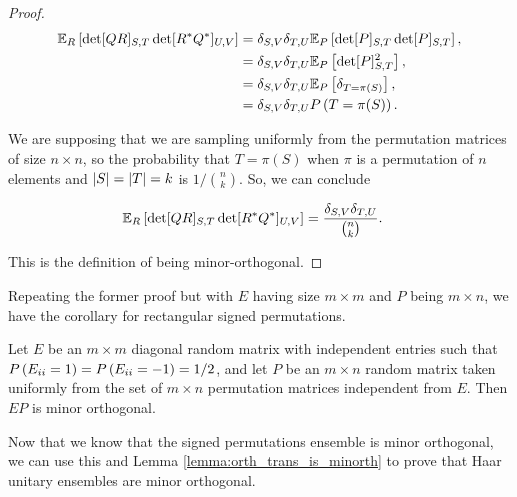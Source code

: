 \begin{proof}
    \begin{align*}
        \mathbb E_R \left[ \det[QR]_{S,T}\det[\hermit{R}\hermit{Q}]_{U,V} \right] &= \delta_{S,V} \delta_{T,U} \mathbb E_{P}\left[ \det [P]_{S,T}\det[P]_{S,T} \right],\\ 
        &= \delta_{S,V} \delta_{T,U} \mathbb E_{P}\left[ \det [P]_{S,T}^2 \right],\\ 
        &= \delta_{S,V} \delta_{T,U} \mathbb E_{P}\left[  \delta_{T=\pi(S)} \right], \\ 
        &= \delta_{S,V} \delta_{T,U} \P{T = \pi(S)}.
    \end{align*}

    We are supposing that we are sampling uniformly from the permutation matrices of size $n \times n$, so the probability that $T = \pi(S)$ when $\pi$ is a permutation of $n$ elements and $\abs{S} = \abs{T} = k$ is $1/\binom{n}{k}$. So, we can conclude

    \begin{align*}
        \mathbb E_R \left[ \det[QR]_{S,T}\det[\hermit{R}\hermit{Q}]_{U,V} \right] &= \frac{\delta_{S,V} \delta_{T,U}}{\binom{n}{k}}.
    \end{align*}

    This is the definition of being minor-orthogonal. %
\end{proof}

Repeating the former proof but with $E$ having size $m\times m$ and $P$ being $m\times n$, we have the corollary for rectangular signed permutations.

\begin{corollary}
    Let $E$ be an $m\times m$ diagonal random matrix with independent entries such that $\P{E_{ii} = 1} = \P{E_{ii} = -1} = 1/2$, and let $P$ be an $m\times n$ random matrix taken uniformly from the set of $m\times n$ permutation matrices independent from $E$. Then $EP$ is minor orthogonal.
\end{corollary}

Now that we know that the signed permutations ensemble is minor orthogonal, we can use this and Lemma \ref{lemma:orth_trans_is_minorth} to prove that Haar unitary ensembles are minor orthogonal.


